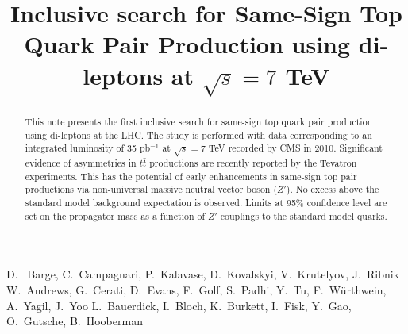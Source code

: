 \documentclass{cmspaper}
\begin{document}
%
\begin{titlepage}
\title{Inclusive search for Same-Sign Top Quark Pair Production using di-leptons at $\sqrt{s} = 7 $ TeV}

  \begin{Authlist}
    D.~ Barge, C.~Campagnari, P.~Kalavase, D.~Kovalskyi, V.~Krutelyov, J.~Ribnik
    W.~Andrews, G.~Cerati, D.~Evans, F.~Golf, S.~Padhi, Y.~Tu, F.~W\"urthwein, A.~Yagil, J.~Yoo
    L.~Bauerdick, I.~Bloch, K.~Burkett, I.~Fisk, Y.~Gao, O.~Gutsche, B.~Hooberman
  \end{Authlist}

\begin{abstract}
This note presents the first inclusive search for same-sign top quark pair production using di-leptons
at the LHC. The study is performed with data corresponding to an integrated luminosity of 35 pb$^{-1}$ at 
$\sqrt{s} = 7 $ TeV recorded  by CMS in 2010. Significant evidence of asymmetries in $t\bar{t}$ 
productions are recently reported by the Tevatron experiments. This has the potential of early enhancements 
in same-sign top pair productions via non-universal massive neutral vector boson ($Z'$). No excess above 
the standard model background expectation is observed. Limits at 95\% confidence level are set 
on the propagator mass as a function of $Z'$ couplings to the standard model quarks. 
\end{abstract}
\end{titlepage}






\clearpage

\end{document}
